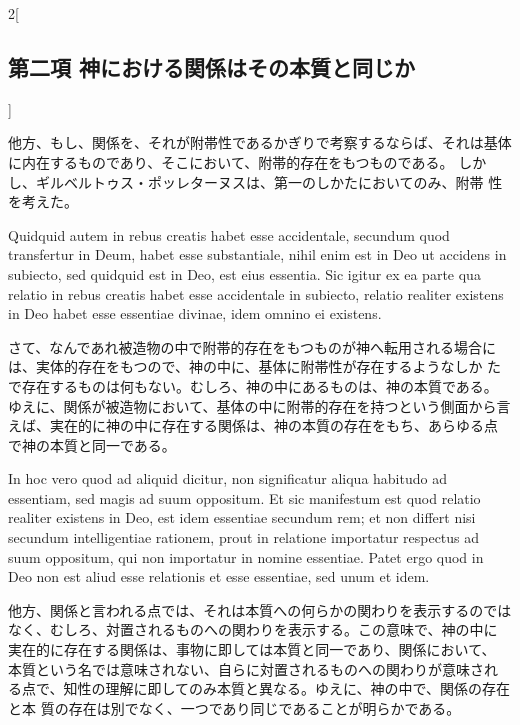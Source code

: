 \documentclass[paper=a4paper,fontsize=10pt,jafontsize=9pt,titlepage]{jlreq}
\begin{document}
\begin{paracol}{2}[\subsection{第二項 神における関係はその本質と同じか}]
\switchcolumn


他方、もし、関係を、それが附帯性であるかぎりで考察するならば、それは基体
 に内在するものであり、そこにおいて、附帯的存在をもつものである。
しかし、ギルベルトゥス・ポッレターヌスは、第一のしかたにおいてのみ、附帯
 性を考えた。


\switchcolumn*


Quidquid
autem in rebus creatis habet esse accidentale, secundum quod transfertur
in Deum, habet esse substantiale, nihil enim est in Deo ut accidens in
subiecto, sed quidquid est in Deo, est eius essentia. Sic igitur ex ea
parte qua relatio in rebus creatis habet esse accidentale in subiecto,
relatio realiter existens in Deo habet esse essentiae divinae, idem
omnino ei existens.


\switchcolumn


さて、なんであれ被造物の中で附帯的存在をもつものが神へ転用される場合に
 は、実体的存在をもつので、神の中に、基体に附帯性が存在するようなしか
 たで存在するものは何もない。むしろ、神の中にあるものは、神の本質である。
ゆえに、関係が被造物において、基体の中に附帯的存在を持つという側面から言
 えば、実在的に神の中に存在する関係は、神の本質の存在をもち、あらゆる点
 で神の本質と同一である。


\switchcolumn*


In hoc vero quod ad aliquid dicitur, non
significatur aliqua habitudo ad essentiam, sed magis ad suum
oppositum. Et sic manifestum est quod relatio realiter existens in Deo,
est idem essentiae secundum rem; et non differt nisi secundum
intelligentiae rationem, prout in relatione importatur respectus ad suum
oppositum, qui non importatur in nomine essentiae. Patet ergo quod in
Deo non est aliud esse relationis et esse essentiae, sed unum et idem.


\switchcolumn


他方、関係と言われる点では、それは本質への何らかの関わりを表示するのでは
 なく、むしろ、対置されるものへの関わりを表示する。この意味で、神の中に
 実在的に存在する関係は、事物に即しては本質と同一であり、関係において、
 本質という名では意味されない、自らに対置されるものへの関わりが意味され
 る点で、知性の理解に即してのみ本質と異なる。ゆえに、神の中で、関係の存在と本
 質の存在は別でなく、一つであり同じであることが明らかである。


\switchcolumn*[\subsection{ad.1}]



\end{paracol}
\end{document}
